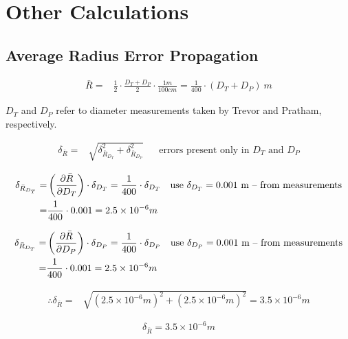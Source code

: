 \documentclass[12pt]{article}
\begin{document}
\clearpage

\section{Other Calculations}
\subsection{Average Radius Error Propagation} \label{sec:RadiusErr}

\begin{align}
	\bar{R} =& \frac{1}{2}\cdot\frac{D_T + D_P}{2}\cdot\frac{1 m}{100 cm} = \frac{1}{400}\cdot(D_T + D_P)\ m \label{e:R_calculation} 	
\end{align}

$D_T$ and $D_P$ refer to diameter measurements taken by Trevor and Pratham, respectively.

\begin{align}
	\delta_{\bar{R}} =& \sqrt{\delta_{\bar{R}_{D_T}}^2 + \delta_{\bar{R}_{D_P}}^2} && \text{errors present only in }D_T \text{ and }D_P \label{e:R_bar_err_exp}
\end{align}

\begin{align}
	\delta_{\bar{R}_{D_T}} =& \left( \frac{\partial \bar{R}}{\partial D_T} \right)\cdot\delta_{D_T} = \frac{1}{400}\cdot\delta_{D_T} && \text{use }\delta_{D_T}=0.001\text{ m -- from measurements} \label{e:R_err_Dt} \\
	=& \frac{1}{400}\cdot0.001=2.5\times10^{-6} m \notag
\end{align}

\begin{align}
	\delta_{\bar{R}_{D_T}} =& \left( \frac{\partial \bar{R}}{\partial D_P} \right)\cdot\delta_{D_P} = \frac{1}{400}\cdot\delta_{D_P} && \text{use }\delta_{D_P}=0.001\text{ m -- from measurements} \label{e:R_err_Dp} \\
	=& \frac{1}{400}\cdot0.001=2.5\times10^{-6} m \notag
\end{align}

\begin{align*}
	\therefore \delta_{\bar{R}} =& \sqrt{(2.5\times10^{-6}m)^2+ (2.5\times10^{-6}m)^2} = 3.5\times10^{-6} m 
\end{align*}

\begin{equation}
	\delta_{\bar{R}} = 3.5\times10^{-6} m
	\label{v:R_bar_err}
\end{equation}
\end{document}
